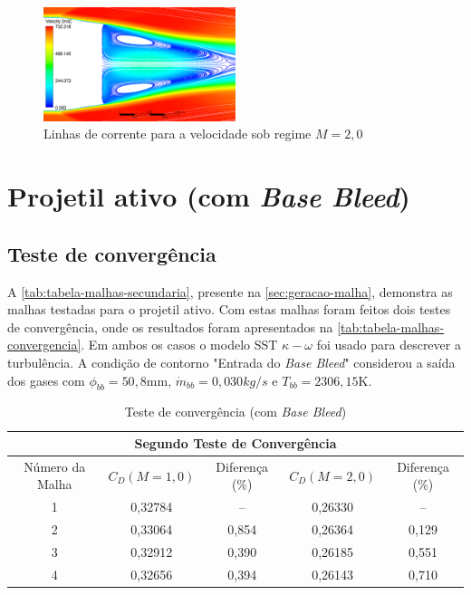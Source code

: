 \begin{figure}[!ht]
    \centering
    \includegraphics[width=0.5\textwidth]{corrente-velocidade-off.png}
    \caption{Linhas de corrente para a velocidade sob regime $M = 2,0$}
    \label{fig:corrente-velocidade-sembasebleed}
\end{figure}

\section{Projetil ativo (com \textit{Base Bleed})}\label{sec:resultados-com-basebleed}

\subsection{Teste de convergência}

A \autoref{tab:tabela-malhas-secundaria}, presente na \autoref{sec:geracao-malha}, demonstra as malhas testadas para o projetil ativo. Com estas malhas foram feitos dois testes de convergência, onde os resultados foram apresentados na \autoref{tab:tabela-malhas-convergencia}. Em ambos os casos o modelo SST $\kappa-\omega$ foi usado para descrever a turbulência. A condição de contorno "Entrada do \textit{Base Bleed}"{} considerou a saída dos gases com $\phi_{bb} = 50,8 \unit{\mm}$, $\Dot{m}_{bb} = 0,030 \si{kg/s}$ e $T_{bb} = 2306,15 \unit{\kelvin}$.

\begin{table}[ht]
\centering
\caption[Teste de convergência (com \textit{Base Bleed})]{Teste de convergência (com \textit{Base Bleed})}
\vspace{0.5cm}
\begin{tabular}{c|c|c|c|c}
\multicolumn{5}{c}{Segundo Teste de Convergência} \\
\hline 
Número da Malha & $C_{D} (M = 1,0)$ & Diferença (\%) & $C_{D} (M = 2,0)$ & Diferença (\%)\\ 
\hline
1 & 0,32784 & -- & 0,26330 & --\\
2 & 0,33064 & 0,854 & 0,26364 & 0,129\\
3 & 0,32912 & 0,390 & 0,26185 & 0,551\\
4 & 0,32656 & 0,394 & 0,26143 & 0,710
\end{tabular}
\label{tab:tabela-malhas-convergencia}
\end{table}

